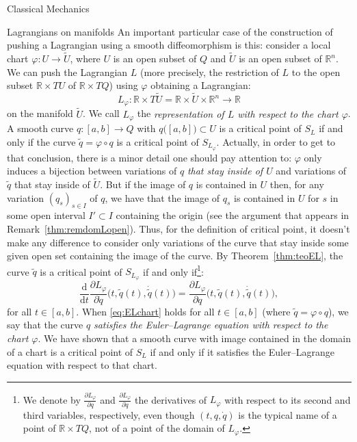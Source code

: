 \documentclass[oneside,a4paper,11pt]{amsbook}
\newcommand{\R}{\mathds R}
\newcommand{\dd}{\mathrm d}
\theoremstyle{remark}\newtheorem{exercise}{Exercise}[chapter]
\theoremstyle{plain}\newtheorem{teo}{Theorem}[section]
\theoremstyle{plain}\newtheorem{lem}[teo]{Lemma}
\theoremstyle{plain}\newtheorem{prop}[teo]{Proposition}
\theoremstyle{plain}\newtheorem{cor}[teo]{Corollary}
\theoremstyle{definition}\newtheorem{defin}[teo]{Definition}
\theoremstyle{remark}\newtheorem{rem}[teo]{Remark}
\theoremstyle{definition}\newtheorem{notation}[teo]{Notation}
\theoremstyle{definition}\newtheorem{convention}[teo]{Convention}
\theoremstyle{definition}\newtheorem{example}[teo]{Example}
\numberwithin{section}{chapter}
\numberwithin{equation}{section}
\begin{document}
\begin{chapter}{Classical Mechanics}
\begin{section}{Lagrangians on manifolds}
An important particular case of the construction of pushing a Lagrangian using a smooth diffeomorphism is this:
consider a local chart $\varphi:U\to\widetilde U$, where $U$ is an open subset of $Q$ and $\widetilde U$ is an open
subset of $\R^n$. We can push the Lagrangian $L$ (more precisely, the restriction of $L$ to the open subset
$\R\times TU$ of $\R\times TQ$) using $\varphi$ obtaining a Lagrangian:
\[L_\varphi:\R\times T\widetilde U=\R\times\widetilde U\times\R^n\longrightarrow\R\]
on the manifold $\widetilde U$. We call $L_\varphi$ the {\em representation of $L$ with respect to the chart
$\varphi$}. A smooth curve $q:[a,b]\to Q$ with $q\big([a,b]\big)\subset U$ is a critical point
of $S_L$ if and only if the curve $\tilde q=\varphi\circ q$ is a critical point of $S_{L_\varphi}$. Actually,
in order to get to that conclusion, there is a minor detail one should pay attention to:
$\varphi$ only induces a bijection between variations of $q$
{\em that stay inside of $U$\/} and variations of $\tilde q$ that stay inside of $\widetilde U$. But if the image
of $q$ is contained in $U$ then, for any variation $(q_s)_{s\in I}$ of $q$, we have that the image of $q_s$ is
contained in $U$ for $s$ in some open interval $I'\subset I$ containing the origin (see the argument that
appears in Remark~\ref{thm:remdomLopen}). Thus, for the definition of critical point, it doesn't make any difference
to consider only variations of the curve that stay inside some given open set containing the image of the curve.
By Theorem~\ref{thm:teoEL}, the curve $\tilde q$ is a critical point of $S_{L_\varphi}$ if and only
if\footnote{%
We denote by $\frac{\partial L_\varphi}{\partial q}$ and
$\frac{\partial L_\varphi}{\partial\dot q}$ the derivatives of
$L_\varphi$ with respect to its second and third variables,
respectively, even though $(t,q,\dot q)$ is the typical name of a
point of $\R\times TQ$, not of a point of the domain of
$L_\varphi$.}:
\begin{equation}\label{eq:ELchart}
\frac{\dd}{\dd t}\frac{\partial L_\varphi}{\partial\dot q}\big(t,\tilde q(t),\dot{\tilde q}(t)\big)=
\frac{\partial L_\varphi}{\partial q}\big(t,\tilde q(t),\dot{\tilde q}(t)\big),
\end{equation}
for all $t\in[a,b]$. When \eqref{eq:ELchart} holds for all $t\in[a,b]$ (where $\tilde q=\varphi\circ q$),
we say that the curve $q$ {\em satisfies the Euler--Lagrange
equation with respect to the chart $\varphi$}. We have shown that a smooth curve with image contained in the domain
of a chart is a critical point of $S_L$ if and only if it satisfies the Euler--Lagrange equation with respect to that chart.

\end{section}
\end{chapter}
\end{document}
